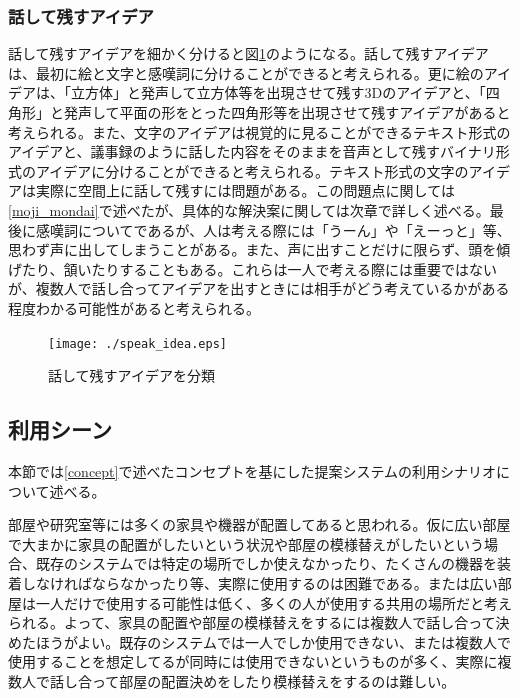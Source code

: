 \documentclass[11pt,a4j, titlepage]{jarticle} %
\begin{document}
\subsubsection{話して残すアイデア} \label{speak_idea}
話して残すアイデアを細かく分けると図\ref{fig:speak_idea}のようになる。話して残すアイデアは、最初に絵と文字と感嘆詞に分けることができると考えられる。更に絵のアイデアは、「立方体」と発声して立方体等を出現させて残す3Dのアイデアと、「四角形」と発声して平面の形をとった四角形等を出現させて残すアイデアがあると考えられる。また、文字のアイデアは視覚的に見ることができるテキスト形式のアイデアと、議事録のように話した内容をそのままを音声として残すバイナリ形式のアイデアに分けることができると考えられる。テキスト形式の文字のアイデアは実際に空間上に話して残すには問題がある。この問題点に関しては\ref{moji_mondai}で述べたが、具体的な解決案に関しては次章で詳しく述べる。最後に感嘆詞についてであるが、人は考える際には「うーん」や「えーっと」等、思わず声に出してしまうことがある。また、声に出すことだけに限らず、頭を傾げたり、頷いたりすることもある。これらは一人で考える際には重要ではないが、複数人で話し合ってアイデアを出すときには相手がどう考えているかがある程度わかる可能性があると考えられる。

\begin{figure}[H]
  \begin{center}
    \texttt{[image: ./speak\_idea.eps]}
    \caption{話して残すアイデアを分類}
    \label{fig:speak_idea}
  \end{center}
\end{figure}

\subsection{利用シーン}
本節では\ref{concept}で述べたコンセプトを基にした提案システムの利用シナリオについて述べる。

部屋や研究室等には多くの家具や機器が配置してあると思われる。仮に広い部屋で大まかに家具の配置がしたいという状況や部屋の模様替えがしたいという場合、既存のシステムでは特定の場所でしか使えなかったり、たくさんの機器を装着しなければならなかったり等、実際に使用するのは困難である。または広い部屋は一人だけで使用する可能性は低く、多くの人が使用する共用の場所だと考えられる。よって、家具の配置や部屋の模様替えをするには複数人で話し合って決めたほうがよい。既存のシステムでは一人でしか使用できない、または複数人で使用することを想定してるが同時には使用できないというものが多く、実際に複数人で話し合って部屋の配置決めをしたり模様替えをするのは難しい。
\end{document}
